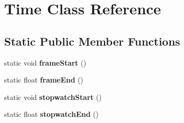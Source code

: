 \hypertarget{class_time}{}\section{Time Class Reference}
\label{class_time}
\subsection*{Static Public Member Functions}
\begin{DoxyCompactItemize}
\item 
\hypertarget{class_time_aa8cbafb13149f3ab1acf24f4853fa828}{}static void {\bfseries frame\+Start} ()\label{class_time_aa8cbafb13149f3ab1acf24f4853fa828}

\item 
\hypertarget{class_time_a40537e913126bebdbe248bb1f90ca175}{}static float {\bfseries frame\+End} ()\label{class_time_a40537e913126bebdbe248bb1f90ca175}

\item 
\hypertarget{class_time_ab147576969e79db3a3553af385cf5ddd}{}static void {\bfseries stopwatch\+Start} ()\label{class_time_ab147576969e79db3a3553af385cf5ddd}

\item 
\hypertarget{class_time_ad0d4fc769e9b22a43a500200bab54fbc}{}static float {\bfseries stopwatch\+End} ()\label{class_time_ad0d4fc769e9b22a43a500200bab54fbc}

\end{DoxyCompactItemize}
